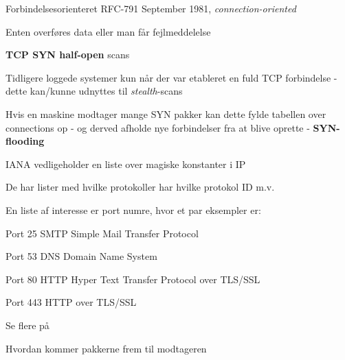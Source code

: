
\begin{list1}
\item Forbindelsesorienteret RFC-791 September 1981, \emph{connection-oriented}
\item Enten overføres data eller man får fejlmeddelelse
\end{list1}






\begin{list2}
\item {\bfseries TCP SYN half-open} scans
\item Tidligere loggede systemer kun når der var etableret en fuld TCP
  forbindelse - dette kan/kunne udnyttes til \emph{stealth}-scans
\item Hvis en maskine modtager mange SYN pakker kan dette fylde
  tabellen over connections op - og derved afholde nye forbindelser
  fra at blive oprette - {\bfseries SYN-flooding}
\end{list2}



\begin{list1}
\item IANA vedligeholder en liste over magiske konstanter i IP
\item De har lister med hvilke protokoller har hvilke protokol ID m.v.
\item En liste af interesse er port numre, hvor et par eksempler er:
\begin{list2}
\item Port 25 SMTP Simple Mail Transfer Protocol
\item Port 53 DNS Domain Name System
\item Port 80 HTTP Hyper Text Transfer Protocol over TLS/SSL
\item Port 443 HTTP over TLS/SSL
\end{list2}
\item Se flere på 
\end{list1}


Hvordan kommer pakkerne frem til modtageren

